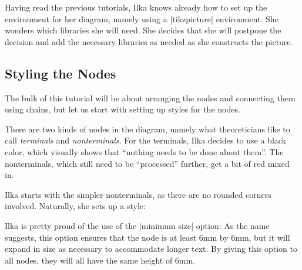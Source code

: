 Having read the previous tutorials, Ilka knows already how to set up the
environment for her diagram, namely using a |tikzpicture| environment. She
wonders which libraries she will need. She decides that she will postpone the
decision and add the necessary libraries as needed as she constructs the
picture.


\subsection{Styling the Nodes}

The bulk of this tutorial will be about arranging the nodes and connecting them
using chains, but let us start with setting up styles for the nodes.

There are two kinds of nodes in the diagram, namely what theoreticians like to
call \emph{terminals} and \emph{nonterminals}. For the terminals, Ilka decides
to use a black color, which visually shows that ``nothing needs to be done
about them''. The nonterminals, which still need to be ``processed'' further,
get a bit of red mixed in.

Ilka starts with the simpler nonterminals, as there are no rounded corners
involved. Naturally, she sets up a style:
%
\begin{codeexample}[preamble={\usetikzlibrary{positioning}}]
\end{codeexample}
%
Ilka is pretty proud of the use of the |minimum size| option: As the name
suggests, this option ensures that the node is at least 6mm by 6mm, but it will
expand in size as necessary to accommodate longer text. By giving this option
to all nodes, they will all have the same height of 6mm.

